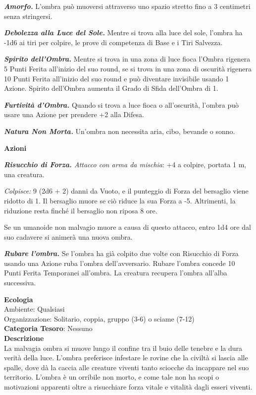 \begin{multicols}{2}
{\emph{\textbf{Amorfo.}} L'ombra può muoversi attraverso uno spazio stretto fino a 3 centimetri senza stringersi.

\emph{\textbf{Debolezza alla Luce del Sole.}} Mentre si trova alla luce del sole, l'ombra ha -1d6 ai tiri per colpire, le prove di competenza di Base e i Tiri Salvezza.

\emph{\textbf{Spirito dell'Ombra.}} Mentre si trova in una zona di luce fioca l'Ombra rigenera 5 Punti Ferita all'inizio del suo round, se si trova in una zona di oscurità rigenera 10 Punti Ferita all'inizio del suo round e può diventare invisibile usando 1 Azione. Spirito dell'Ombra aumenta il Grado di Sfida dell'Ombra di 1.

\emph{\textbf{Furtività d'Ombra.}} Quando si trova a luce fioca o all'oscurità, l'ombra può usare una Azione per prendere +2 alla Difesa.

\emph{\textbf{Natura Non Morta.}} Un'ombra non necessita aria, cibo, bevande o sonno.

\textbf{Azioni}

\emph{\textbf{Risucchio di Forza.} Attacco con arma da mischia}: +4 a colpire, portata 1 m, una creatura.

\emph{Colpisce:} 9 (2d6 + 2) danni da Vuoto, e il punteggio di Forza del bersaglio viene ridotto di 1. Il bersaglio muore se ciò riduce la sua Forza a -5. Altrimenti, la riduzione resta finché il bersaglio non riposa 8 ore.

Se un umanoide non malvagio muore a causa di questo attacco, entro 1d4 ore dal suo cadavere si animerà una nuova ombra.

\emph{\textbf{Rubare l'ombra.}} Se l'ombra ha già colpito due volte con Risucchio di Forza usando una Azione ruba l'ombra dell'avversario. Rubare l'ombra concede 10 Punti Ferita Temporanei all'ombra. La creatura recupera l'ombra all'alba successiva.

\textbf{Ecologia}\\
Ambiente: Qualsiasi\\
Organizzazione: Solitario, coppia, gruppo (3-6) o sciame (7-12)\\
\textbf{Categoria Tesoro}: Nessuno\\
\textbf{Descrizione}\\
La malvagia ombra si muove lungo il confine tra il buio delle tenebre e la dura verità della luce. L'ombra preferisce infestare le rovine che la civiltà si lascia alle spalle, dove dà la caccia alle creature viventi tanto sciocche da incappare nel suo territorio. L'ombra è un orribile non morto, e come tale non ha scopi o motivazioni apparenti oltre a risucchiare forza vitale e vitalità dagli esseri viventi.

}
\end{multicols}
